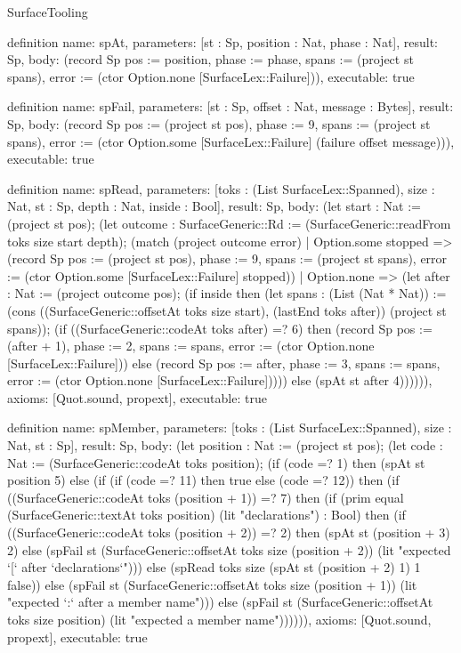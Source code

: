 \begin{lexlean}{SurfaceTooling}
\begin{semanticmodule}
definition{
  name: spAt,
  parameters: [st : Sp, position : Nat, phase : Nat],
  result: Sp,
  body: (record Sp {pos := position, phase := phase, spans := (project st spans), error := (ctor Option.none [SurfaceLex::Failure])}),
  executable: true
}

definition{
  name: spFail,
  parameters: [st : Sp, offset : Nat, message : Bytes],
  result: Sp,
  body: (record Sp {pos := (project st pos), phase := 9, spans := (project st spans), error := (ctor Option.some [SurfaceLex::Failure] (failure offset message))}),
  executable: true
}

definition{
  name: spRead,
  parameters: [toks : (List SurfaceLex::Spanned), size : Nat, st : Sp, depth : Nat, inside : Bool],
  result: Sp,
  body: (let start : Nat := (project st pos); (let outcome : SurfaceGeneric::Rd := (SurfaceGeneric::readFrom toks size start depth); (match (project outcome error)
    | Option.some stopped => (record Sp {pos := (project st pos), phase := 9, spans := (project st spans), error := (ctor Option.some [SurfaceLex::Failure] stopped)})
    | Option.none => (let after : Nat := (project outcome pos); (if inside then (let spans : (List (Nat * Nat)) := (cons ((SurfaceGeneric::offsetAt toks size start), (lastEnd toks after)) (project st spans)); (if ((SurfaceGeneric::codeAt toks after) =? 6) then (record Sp {pos := (after + 1), phase := 2, spans := spans, error := (ctor Option.none [SurfaceLex::Failure])}) else (record Sp {pos := after, phase := 3, spans := spans, error := (ctor Option.none [SurfaceLex::Failure])}))) else (spAt st after 4)))))),
  axioms: [Quot.sound, propext],
  executable: true
}

definition{
  name: spMember,
  parameters: [toks : (List SurfaceLex::Spanned), size : Nat, st : Sp],
  result: Sp,
  body: (let position : Nat := (project st pos); (let code : Nat := (SurfaceGeneric::codeAt toks position); (if (code =? 1) then (spAt st position 5) else (if (if (code =? 11) then true else (code =? 12)) then (if ((SurfaceGeneric::codeAt toks (position + 1)) =? 7) then (if (prim equal (SurfaceGeneric::textAt toks position) (lit "declarations") : Bool) then (if ((SurfaceGeneric::codeAt toks (position + 2)) =? 2) then (spAt st (position + 3) 2) else (spFail st (SurfaceGeneric::offsetAt toks size (position + 2)) (lit "expected `[` after `declarations`"))) else (spRead toks size (spAt st (position + 2) 1) 1 false)) else (spFail st (SurfaceGeneric::offsetAt toks size (position + 1)) (lit "expected `:` after a member name"))) else (spFail st (SurfaceGeneric::offsetAt toks size position) (lit "expected a member name")))))),
  axioms: [Quot.sound, propext],
  executable: true
}


\end{semanticmodule}
\end{lexlean}
